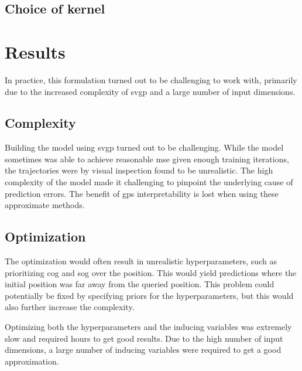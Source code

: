 \subsection{Choice of kernel}


\section{Results}

In practice, this formulation turned out to be challenging to work with, primarily due to the increased complexity of \acrshort{svgp} and a large number of input dimensions.

\subsection{Complexity}
Building the model using \acrshort{svgp} turned out to be challenging. While the model sometimes was able to achieve reasonable \acrshort{mse} given enough training iterations, the trajectories were by visual inspection found to be unrealistic. The high complexity of the model made it challenging to pinpoint the underlying cause of prediction errors. The benefit of \acrshort{gp}s interpretability is lost when using these approximate methods.

\subsection{Optimization}
The optimization would often result in unrealistic hyperparameters, such as prioritizing \acrshort{cog} and \acrshort{sog} over the position. This would yield predictions where the initial position was far away from the queried position. This problem could potentially be fixed by specifying priors for the hyperparameters, but this would also further increase the complexity. 

Optimizing both the hyperparameters and the inducing variables was extremely slow and required hours to get good results. Due to the high number of input dimensions, a large number of inducing variables were required to get a good approximation. 




